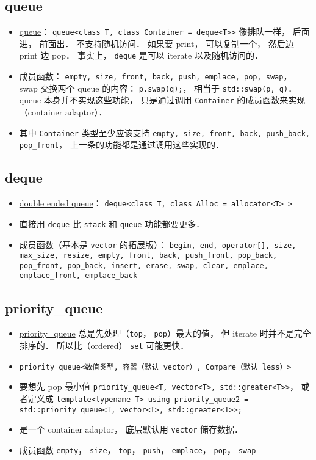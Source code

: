 \subsection{queue}
\begin{itemize}
\item \href{https://cplusplus.com/reference/queue/queue/}{queue}： \verb|queue<class T, class Container = deque<T>>| 像排队一样， 后面进， 前面出． 不支持随机访问． 如果要 print， 可以复制一个， 然后边 print 边 pop． 事实上， \verb|deque| 是可以 iterate 以及随机访问的．
\item 成员函数： \verb|empty, size, front, back, push, emplace, pop, swap|， swap 交换两个 queue 的内容： \verb|p.swap(q);|， 相当于 \verb|std::swap(p, q)|． queue 本身并不实现这些功能， 只是通过调用 \verb|Container| 的成员函数来实现（container adaptor）．
\item 其中 \verb|Container| 类型至少应该支持 \verb|empty, size, front, back, push_back, pop_front|， 上一条的功能都是通过调用这些实现的．
\end{itemize}

\subsection{deque}
\begin{itemize}
\item \href{https://cplusplus.com/reference/deque/deque/}{double ended queue}： \verb|deque<class T, class Alloc = allocator<T> >|
\item 直接用 \verb|deque| 比 \verb|stack| 和 \verb|queue| 功能都要更多．
\item 成员函数（基本是 \verb|vector| 的拓展版）： \verb|begin, end, operator[], size, max_size, resize, empty, front, back, push_front, pop_back, pop_front, pop_back, insert, erase, swap, clear, emplace, emplace_front, emplace_back|
\end{itemize}

\subsection{priority\_queue}
\begin{itemize}
\item \href{https://cplusplus.com/reference/queue/priority_queue/}{priority\_queue} 总是先处理（\verb|top|， \verb|pop|）最大的值， 但 iterate 时并不是完全排序的． 所以比（ordered） \verb|set| 可能更快．
\item \verb|priority_queue<数值类型, 容器（默认 vector）, Compare（默认 less）>|
\item 要想先 pop 最小值 \verb|priority_queue<T, vector<T>, std::greater<T>>|， 或者定义成 \verb|template<typename T> using priority_queue2 = std::priority_queue<T, vector<T>, std::greater<T>>;|
\item 是一个 container adaptor， 底层默认用 \verb|vector| 储存数据．
\item 成员函数 \verb|empty|， \verb|size|， \verb|top|， \verb|push|， \verb|emplace|， \verb|pop|， \verb|swap|
\end{itemize}


